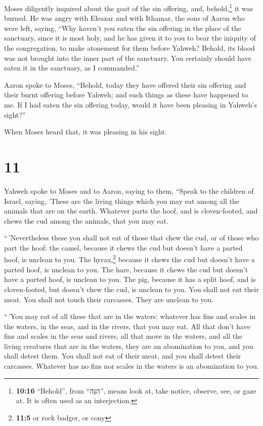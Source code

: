  Moses diligently inquired about the goat of the sin
offering, and, behold,\footnote{\textbf{10:16} ``Behold'', from
  ``הִנֵּה'', means look at, take notice, observe, see, or gaze at. It
  is often used as an interjection.} it was burned. He was angry with
Eleazar and with Ithamar, the sons of Aaron who were left, saying,
 ``Why haven't you eaten the sin offering in the place of
the sanctuary, since it is most holy, and he has given it to you to bear
the iniquity of the congregation, to make atonement for them before
Yahweh?  Behold, its blood was not brought into the inner
part of the sanctuary. You certainly should have eaten it in the
sanctuary, as I commanded.''

 Aaron spoke to Moses, ``Behold, today they have offered
their sin offering and their burnt offering before Yahweh; and such
things as these have happened to me. If I had eaten the sin offering
today, would it have been pleasing in Yahweh's sight?''

 When Moses heard that, it was pleasing in his sight.

\hypertarget{section-10}{%
\section{11}\label{section-10}}

 Yahweh spoke to Moses and to Aaron, saying to them,
 ``Speak to the children of Israel, saying, 'These are the
living things which you may eat among all the animals that are on the
earth.  Whatever parts the hoof, and is cloven-footed, and
chews the cud among the animals, that you may eat.

 ``\,'Nevertheless these you shall not eat of those that
chew the cud, or of those who part the hoof: the camel, because it chews
the cud but doesn't have a parted hoof, is unclean to you.
 The hyrax,\footnote{\textbf{11:5} or rock badger, or cony}
because it chews the cud but doesn't have a parted hoof, is unclean to
you.  The hare, because it chews the cud but doesn't have
a parted hoof, is unclean to you.  The pig, because it has
a split hoof, and is cloven-footed, but doesn't chew the cud, is unclean
to you.  You shall not eat their meat. You shall not touch
their carcasses. They are unclean to you.

 ``\,'You may eat of all these that are in the waters:
whatever has fins and scales in the waters, in the seas, and in the
rivers, that you may eat.  All that don't have fins and
scales in the seas and rivers, all that move in the waters, and all the
living creatures that are in the waters, they are an abomination to you,
 and you shall detest them. You shall not eat of their
meat, and you shall detest their carcasses.  Whatever has
no fins nor scales in the waters is an abomination to you.

